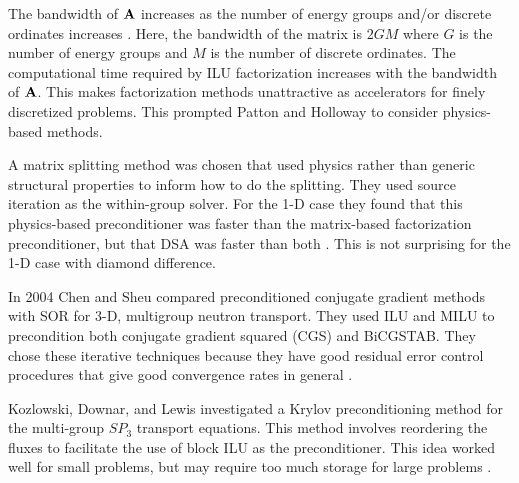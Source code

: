 The bandwidth of $\mathbf{A}$ increases as the number of energy groups and/or discrete ordinates increases \cite{Patton2002}. Here, the bandwidth of the matrix is $2GM$ where $G$ is the number of energy groups and $M$ is the number of discrete ordinates. The computational time required by ILU factorization increases with the bandwidth of $\mathbf{A}$. This makes factorization methods unattractive as accelerators for finely discretized problems. This prompted Patton and Holloway to consider physics-based methods. 

A matrix splitting method was chosen that used physics rather than generic structural properties to inform how to do the splitting. They used source iteration as the within-group solver. For the 1-D case they found that this physics-based preconditioner was faster than the matrix-based factorization preconditioner, but that DSA was faster than both \cite{Patton2002}. This is not surprising for the 1-D case with diamond difference. 

In 2004 Chen and Sheu compared preconditioned conjugate gradient methods with SOR for 3-D, multigroup neutron transport. They used ILU and MILU to precondition both conjugate gradient squared (CGS) and BiCGSTAB. They chose these iterative techniques because they have good residual error control procedures that give good convergence rates in general \cite{Chen2004}.

Kozlowski, Downar, and Lewis investigated a Krylov preconditioning method for the multi-group $SP_3$ transport equations. This method involves reordering the fluxes to facilitate the use of block ILU as the preconditioner. This idea worked well for small problems, but may require too much storage for large problems \cite{Kozlowski2003}.

